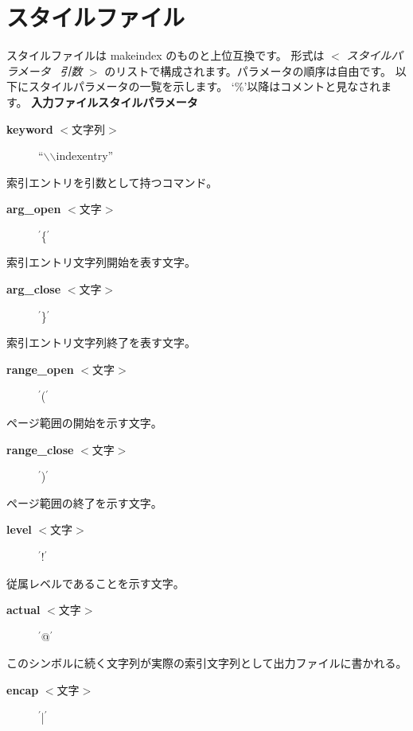 \documentclass[10pt,dvipdfmx]{jsarticle}
\begin{document}
\section*{スタイルファイル}
 スタイルファイルは makeindex のものと上位互換です。 形式は $<$ \emph{スタイルパラメータ}
 \emph{引数}
$>$ のリストで構成されます。パラメータの順序は自由です。 以下にスタイルパラメータの一覧を示します。 `\%'以降はコメントと見なされます。\textbf{ 入力ファイルスタイルパラメータ}
\begin{description}
\item[\textbf{keyword}
 $<$文字列$>$] ``$\backslash$$\backslash$indexentry''

\end{description}
 索引エントリを引数として持つコマンド。\begin{description}
\item[\textbf{arg\_open}
 $<$文字$>$] $^\prime$\{$^\prime$

\end{description}
 索引エントリ文字列開始を表す文字。\begin{description}
\item[\textbf{arg\_close}
 $<$文字$>$] $^\prime$\}$^\prime$

\end{description}
 索引エントリ文字列終了を表す文字。\begin{description}
\item[\textbf{range\_open}
 $<$文字$>$] $^\prime$($^\prime$

\end{description}
 ページ範囲の開始を示す文字。\begin{description}
\item[\textbf{range\_close}
 $<$文字$>$] $^\prime$)$^\prime$

\end{description}
 ページ範囲の終了を示す文字。\begin{description}
\item[\textbf{level}
 $<$文字$>$] $^\prime$!$^\prime$

\end{description}
 従属レベルであることを示す文字。\begin{description}
\item[\textbf{actual}
 $<$文字$>$] $^\prime$@$^\prime$

\end{description}
 このシンボルに続く文字列が実際の索引文字列として出力ファイルに書かれる。\begin{description}
\item[\textbf{encap}
 $<$文字$>$] $^\prime$|$^\prime$

\end{description}
\end{document}
